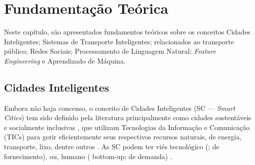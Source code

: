 \documentclass[
	12pt,				%
	oneside,			%
	a4paper,			%
	english,			%
	brazil				%
	]{abntex2ppgsi}
\begin{document}
% 
%
%
%
%

\postextual


\chapter{Fundamentação Teórica}
\label{fundamentacao}
Neste capítulo, são apresentados fundamentos teóricos sobre os conceitos Cidades Inteligentes; Sistemas de Transporte Inteligentes; relacionados ao transporte público;  Redes Sociais; Processamento de Linguagem Natural; \textit{Feature Engineering} e Aprendizado de Máquina.

\section{Cidades Inteligentes}
\label{smartCities}

Embora não haja concenso, o conceito de Cidades Inteligentes (SC --- \textit{Smart Cities}) tem sido definido pela literatura principalmente como cidades sustentáveis e socialmente inclusivas \cite{Wang2017}, que utilizam Tecnologias da Informação e Comunicação (TICs) para gerir eficientemente seus respectivos recursos naturais, de energia, transporte, lixo, dentre outros \cite{Ahvenniemi2017}. As SC podem ter viés tecnológico (; de fornecimento), ou, humano ( bottom-up; de demanda) \cite{Kummitha2017}. 
\end{document}
